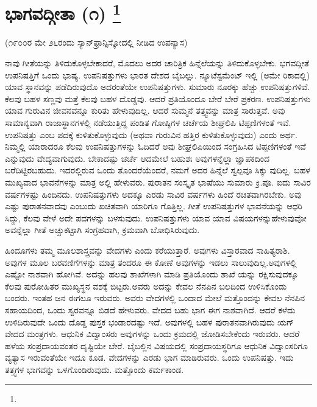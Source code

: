 
\chapter[ಭಾಗವದ್ಗೀತಾ (೧) ]{ಭಾಗವದ್ಗೀತಾ (೧) \protect\footnote{}}

\centerline{(೧೯೦೦ರ ಮೇ ೨೬ರಂದು ಸ್ಯಾನ್​ಫ್ರಾನ್ಸಿಸ್ಕೋದಲ್ಲಿ ನೀಡಿದ ಉಪನ್ಯಾಸ)}

ನಾವು ಗೀತೆಯನ್ನು ತಿಳಿದುಕೊಳ್ಳಬೇಕಾದರೆ, ಮೊದಲು ಅದರ ಚಾರಿತ್ರಿಕ ಹಿನ್ನೆಲೆಯನ್ನು ತಿಳಿದುಕೊಳ್ಳಬೇಕು. ಭಗವದ್ಗೀತೆ ಉಪನಿಷತ್ತಿಗೆ ಒಂದು ಭಾಷ್ಯ. ಉಪನಿಷತ್ತುಗಳು ಭಾರತ ದೇಶದ ಬೈಬಲ್ಲು. ನ್ಯೂಟೆಸ್ಟಮೆಂಟ್​ ಇಲ್ಲಿ (ಅಮೇ ರಿಕಾದಲ್ಲಿ) ಯಾವ ಸ್ಥಾನವನ್ನು ಪಡೆದಿರುವುದೊ ಅದರಂತೆಯೇ ಉಪನಿಷತ್ತುಗಳು. ಸುಮಾರು ನೂರಕ್ಕು ಹೆಚ್ಚು ಉಪನಿಷತ್ತುಗಳಿವೆ. ಕೆಲವು ಬಹಳ ಸಣ್ಣವು ಮತ್ತೆ ಕೆಲವು ಬಹಳ ದೊಡ್ಡವು. ಆದರೆ ಪ್ರತಿಯೊಂದೂ ಬೇರೆ ಬೇರೆ ಪ್ರಕರಣ. ಉಪನಿಷತ್ತುಗಳು ಯಾವ ಗುರುವಿನ ಜೀವನವನ್ನೂ ಕುರಿತು ಹೇಳುವುದಿಲ್ಲ. ಆದರೆ ಸುಮ್ಮನೆ ತತ್ತ್ವವನ್ನು ಮಾತ್ರ ಸಾರುತ್ತವೆ. ಅವು ಸಾಮಾನ್ಯವಾಗಿ ರಾಜಾಸ್ಥಾನಗಳಲ್ಲಿ ನಡೆಯುತ್ತಿದ್ದ ಪಂಡಿತ ಗೋಷ್ಠಿಗಳ ಚರ್ಚೆಯ ಶೀಘ್ರಲಿಪಿ ಟಿಪ್ಪಣಿಗಳಂತೆ ಇವೆ. ಉಪನಿಷತ್ತು ಎಂಬ ಪದಕ್ಕೆ ಕುಳಿತುಕೊಳ್ಳುವುದು (ಅಥವಾ ಗುರುವಿನ ಹತ್ತಿರ ಕುಳಿತುಕೊಳ್ಳುವುದು) ಎಂದು ಅರ್ಥ. ನಿಮ್ಮಲ್ಲಿ ಯಾರಾದರೂ ಕೆಲವು ಉಪನಿಷತ್ತುಗಳನ್ನು ಓದಿದರೆ ಅವು ಶೀಘ್ರಲಿಪಿಯಿಂದ ಸಂಗ್ರಹಿಸಿದ ಟಿಪ್ಪಣಿಗಳಂತೆ ಇವೆ ಎನ್ನುವುದು ವೇದ್ಯವಾಗುವುದು. ಬೇಕಾದಷ್ಟು ಚರ್ಚೆ ಆದಮೇಲೆ ಬಹುಶಃ ಅವುಗಳನ್ನೆಲ್ಲಾ ಜ್ಞಾಪಕದಿಂದ ಬರೆದಿಟ್ಟಿರಬಹುದು. ಇದರಲ್ಲಿರುವ ಒಂದು ತೊಂದರೆಯೆಂದರೆ, ನಮಗೆ ಅದರ ಹಿನ್ನೆಲೆ ಸ್ವಲ್ಪವೂ ಸಿಕ್ಕು ವುದಿಲ್ಲ. ಬಹಳ ಮುಖ್ಯವಾದ ಭಾವನೆಗಳನ್ನು ಮಾತ್ರ ಅಲ್ಲಿ ಹೇಳುವರು. ಪುರಾತನ ಸಂಸ್ಕೃತ ಭಾಷೆಯು ಸುಮಾರು ಕ್ರಿ.ಪೂ. ಐದು ಸಾವಿರ ವರ್ಷಗಳಷ್ಟು ಹಿಂದಿನದು. ಉಪನಿಷತ್ತುಗಳು ಅದಕ್ಕೂ ಎರಡು ಸಾವಿರ ವರ್ಷಗಳು ಹಿಂದೆ ರಚಿತವಾಗಿರಬೇಕು. ಅವು ಎಷ್ಟು ಪುರಾತನವಾದವು ಎಂಬುದು ಖಚಿತವಾಗಿ ಯಾರಿಗೂ ಗೊತ್ತಿಲ್ಲ. ಗೀತೆ ಉಪನಿಷತ್ತುಗಳ ಭಾವನೆಯನ್ನು ಆಧರಿ ಸಿದ್ದು, ಕೆಲವು ವೇಳೆ ಅದೇ ಪದಗಳನ್ನು ಬಳಸುವುದು. ಉಪನಿಷತ್ತುಗಳು ಯಾವ ಯಾವ ವಿಷಯಗಳನ್ನುಹೇಳುವುವೋ ಅವನ್ನೆಲ್ಲಾ ಗೀತೆ ಅಚ್ಚುಕಟ್ಟಾಗಿ ಸಂಗ್ರಹವಾಗಿ, ಕ್ರಮವಾಗಿ ಬೋಧಿಸಿರುವುದು.

ಹಿಂದೂಗಳು ತಮ್ಮ ಮೂಲಶಾಸ್ತ್ರವನ್ನು ವೇದಗಳು ಎಂದು ಕರೆಯುತ್ತಾರೆ. ಅವುಗಳು ವಿಸ್ತಾರವಾದ ಸಾಹಿತ್ಯರಾಶಿ. ಅವುಗಳ ಮೂಲ ಬರವಣಿಗೆಗಳನ್ನು ಮಾತ್ರ ತಂದರೂ ಈ ಕೋಣೆ ಅವುಗಳನ್ನು ಇಡಲು ಸಾಲುವುದಿಲ್ಲ.ಅವುಗಳಲ್ಲಿ ಎಷ್ಟೋ ನಾಶವಾಗಿ ಹೋಗಿವೆ. ಅದನ್ನು ಹಲವು ಶಾಖೆಗಳಾಗಿ ಮಾಡಿ ಪ್ರತಿಯೊಂದು ಶಾಖೆ ಯನ್ನು ರಕ್ಷಿಸುವುದಕ್ಕೂ ಕೆಲವು ಪುರೋಹಿತರ ಮುಖ್ಯಸ್ಥನ ವಶಕ್ಕೆ ಬಿಟ್ಟರು.ಅವರು ಅದನ್ನು ಕೇವಲ ನೆನಪಿನ ಬಲದಿಂದ ಉಳಿಸಿಕೊಂಡು ಬಂದರು. ಇಂತಹ ಜನ ಈಗಲೂ ಇರುವರು. ಅವರು ವೇದಗಳಲ್ಲಿ ಒಂದಾದ ಮೇಲೆ ಮತ್ತೊಂದನ್ನು ಕೇವಲ ನೆನಪಿನ ಸಹಾಯದಿಂದ, ಒಂದು ಸ್ವರವನ್ನೂ ಬಿಡದೆ ಹೇಳುವರು. ವೇದದ ಬಹು ಭಾಗ ಈಗ ನಾಶವಾಗಿದೆ. ಆದರೆ ಕಳೆದು ಉಳಿದಿರುವುದೇ ಒಂದು ದೊಡ್ಡ ಪುಸ್ತಕ ಭಂಡಾರದಷ್ಟು ಇದೆ. ಅವುಗಳಲ್ಲಿ ಬಹಳ ಪುರಾತನವಾಗಿರುವುದು ಋಗ್​ ವೇದದ ಮಂತ್ರಗಳು. ಆಧುನಿಕ ವಿದ್ವಾಂಸರು ಅವುಗಳನ್ನು ಒಂದು ಕ್ರಮದಲ್ಲಿ ಜೋಡಿಸಬೇಕೆಂದು ಇರುವರು. ಆದರೆ ಹಳೆಯ ಸಂಪ್ರದಾಯವಂತರ ದೃಷ್ಟಿಯೇ ಬೇರೆ. ಬೈಬಲ್ಲಿನ ವಿಷಯದಲ್ಲಿ ಸಂಪ್ರದಾಯಸ್ಥರಿಗೂ ಆಧುನಿಕ ವಿದ್ವಾಂಸರಿಗೂ ವ್ಯತ್ಯಾಸ ಇರುವಂತೆಯೇ ಇದೂ ಕೂಡ. ವೇದಗಳನ್ನು ಎರಡು ಭಾಗ ಮಾಡಿರುವರು. ಒಂದು ಉಪನಿಷತ್ತು. ಇದು ತತ್ತ್ವಗಳ ಭಾಗವನ್ನು ಒಳಗೊಂಡಿರುವುದು. ಮತ್ತೊಂದು ಕರ್ಮಕಾಂಡ.

